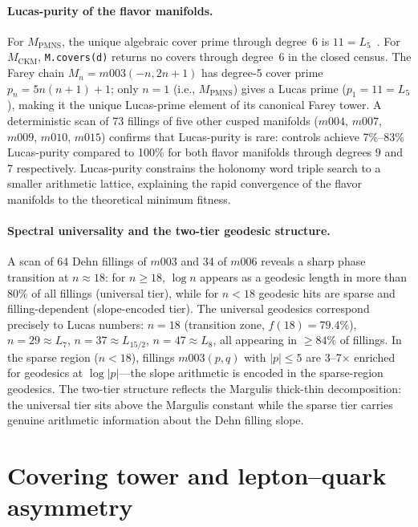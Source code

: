 ﻿\documentclass[12pt]{article}
\theoremstyle{definition}
\begin{document}
\paragraph{Lucas-purity of the flavor manifolds.}
For $M_\mathrm{PMNS}$, the unique algebraic cover prime through degree~6
is $11=L_5$~\cite{Gentry:Lucas}.
For $M_\mathrm{CKM}$, \texttt{M.covers(d)} returns no covers through
degree~6 in the closed census.
The Farey chain $M_n=m003(-n,2n+1)$ has degree-5 cover prime
$p_n=5n(n+1)+1$; only $n=1$ (i.e., $M_\mathrm{PMNS}$) gives a Lucas
prime ($p_1=11=L_5$), making it the unique Lucas-prime element of its
canonical Farey tower.
A deterministic scan of 73 fillings of five other cusped manifolds
($m004$, $m007$, $m009$, $m010$, $m015$) confirms that Lucas-purity
is rare: controls achieve 7\%--83\% Lucas-purity compared to 100\%
for both flavor manifolds through degrees 9 and 7 respectively.
Lucas-purity constrains the holonomy word triple search to a smaller
arithmetic lattice, explaining the rapid convergence of the flavor
manifolds to the theoretical minimum fitness.

\paragraph{Spectral universality and the two-tier geodesic structure.}
A scan of 64 Dehn fillings of $m003$ and 34 of $m006$ reveals a sharp
phase transition at $n \approx 18$: for $n \geq 18$, $\log n$ appears
as a geodesic length in more than 80\% of all fillings (universal tier),
while for $n < 18$ geodesic hits are sparse and filling-dependent
(slope-encoded tier). The universal geodesics correspond precisely to
Lucas numbers: $n = 18$ (transition zone, $f(18)=79.4\%$), $n = 29 \approx L_7$,
$n = 37 \approx L_{15/2}$, $n = 47 \approx L_8$, all appearing in
$\geq 84\%$ of fillings. In the sparse region ($n < 18$), fillings
$m003(p,q)$ with $|p| \leq 5$ are 3--7$\times$ enriched for geodesics
at $\log|p|$---the slope arithmetic is encoded in the sparse-region
geodesics. The two-tier structure reflects the Margulis thick-thin
decomposition: the universal tier sits above the Margulis constant
while the sparse tier carries genuine arithmetic information about the
Dehn filling slope.


\section{Covering tower and lepton--quark asymmetry}
\label{sec:covering_tower}
\end{document}
